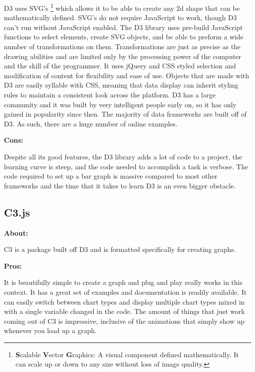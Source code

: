 \documentclass[draftclsnofoot,onecolumn,letterpaper,10pt,compsoc]{IEEEtran}
\begin{document}
    D3 uses SVG's \footnote{\textbf{S}calable \textbf{V}ector \textbf{G}raphics: A visual component defined mathematically. It can scale up or down to any size without loss of image quality.} which allows it to be able to create any 2d shape that can be mathematically defined.
    SVG's do not require JavaScript to work, though D3 can't run without JavaScript enabled.
    The D3 library uses pre-build JavaScript functions to select elements, create SVG objects, and be able to preform a wide number of transformations on them.\cite{d3.org}
    Transformations are just as precise as the drawing abilities and are limited only by the processing power of the computer and the skill of the programmer.
    It uses jQuery and CSS styled selection and modification of content for flexibility and ease of use.
    Objects that are made with D3 are easily syllable with CSS, meaning that data display can inherit styling rules to maintain a consistent look across the platform.
    D3 has a large community and it was built by very intelligent people early on, so it has only gained in popularity since then.\cite{DataVisProCon}
    The majority of data frameworks are built off of D3.
    As such, there are a huge number of online examples.

    \noindent \textbf{Cons:}

    Despite all its good features, the D3 library adds a lot of code to a project, the learning curve is steep, and the code needed to accomplish a task is verbose.\cite{DataVisProCon}
    The code required to set up a bar graph is massive compared to most other frameworks and the time that it takes to learn D3 is an even bigger obstacle.

  \subsection{C3.js}
    \textbf{About:}

    C3 is a package built off D3 and is formatted specifically for creating graphs.

    \noindent \textbf{Pros:}

    It is beautifully simple to create a graph and plug and play really works in this context.
    It has a great set of examples and documentation is readily available.
    It can easily switch between chart types and display multiple chart types mixed in with a single variable changed in the code.\cite{c3.org}
    The amount of things that just work coming out of C3 is impressive, inclusive of the animations that simply show up whenever you load up a graph.
\end{document}
